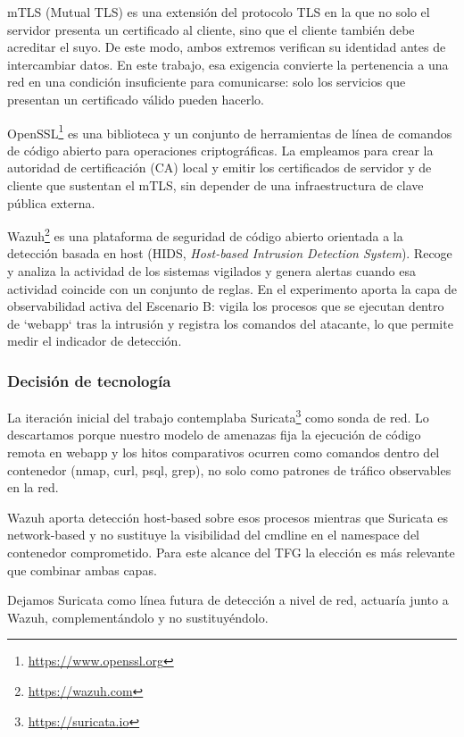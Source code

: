 \documentclass[11pt,spanish,listoffigures,listoftables]{tfgetsinf}
\begin{document}
    mTLS (Mutual TLS) es una extensión del protocolo TLS en la que no solo el servidor presenta un certificado al cliente, sino que el cliente también debe acreditar el suyo. De este modo, ambos extremos verifican su identidad antes de intercambiar datos. En este trabajo, esa exigencia convierte la pertenencia a una red en una condición insuficiente para comunicarse: solo los servicios que presentan un certificado válido pueden hacerlo.

    OpenSSL\footnote{\url{https://www.openssl.org}} es una biblioteca y un conjunto de herramientas de línea de comandos de código abierto para operaciones criptográficas. La empleamos para crear la autoridad de certificación (CA) local y emitir los certificados de servidor y de cliente que sustentan el mTLS, sin depender de una infraestructura de clave pública externa.

    Wazuh\footnote{\url{https://wazuh.com}} es una plataforma de seguridad de código abierto orientada a la detección basada en host (HIDS, \textit{Host-based Intrusion Detection System}). Recoge y analiza la actividad de los sistemas vigilados y genera alertas cuando esa actividad coincide con un conjunto de reglas. En el experimento aporta la capa de observabilidad activa del Escenario B: vigila los procesos que se ejecutan dentro de `webapp` tras la intrusión y registra los comandos del atacante, lo que permite medir el indicador de detección.

        \subsubsection{Decisión de tecnología}
        La iteración inicial del trabajo contemplaba Suricata\footnote{\url{https://suricata.io}} como sonda de red. Lo descartamos porque nuestro modelo de amenazas fija la ejecución de código remota en webapp y los hitos comparativos ocurren como comandos dentro del contenedor (nmap, curl, psql, grep), no solo como patrones de tráfico observables en la red.

        Wazuh aporta detección host-based sobre esos procesos mientras que Suricata es network-based y no sustituye la visibilidad del cmdline en el namespace del contenedor comprometido. Para este alcance del TFG la elección es más relevante que combinar ambas capas. 
        
        Dejamos Suricata como línea futura de detección a nivel de red, actuaría junto a Wazuh, complementándolo y no sustituyéndolo.
    
    \FloatBarrier
\end{document}
